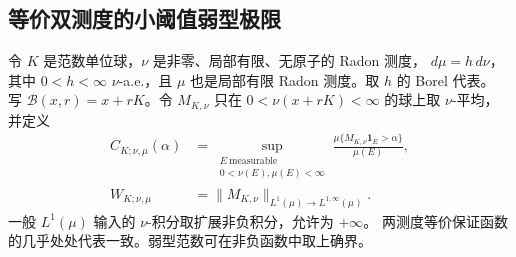 \subsection{等价双测度的小阈值弱型极限}\label{sec:two-measure-weak}

令 $K$ 是范数单位球，$\nu$ 是非零、局部有限、无原子的 Radon 测度，
$d\mu=h\,d\nu$，其中 $0<h<\infty$ $\nu$-a.e.，且 $\mu$ 也是局部有限 Radon 测度。取 $h$ 的 Borel 代表。
写 $\mathcal B(x,r)=x+rK$。令 $M_{K,\nu}$ 只在 $0<\nu(x+rK)<\infty$ 的球上取 $\nu$-平均，并定义
\[
 \begin{aligned}
 C_{K;\nu,\mu}(\alpha)&=
 \sup_{\substack{E\ \mathrm{measurable}\\0<\nu(E),\mu(E)<\infty}}
 \frac{\mu\{M_{K,\nu}\mathbf1_E>\alpha\}}{\mu(E)},\\
 W_{K;\nu,\mu}&=\|M_{K,\nu}\|_{L^1(\mu)\to L^{1,\infty}(\mu)}.
 \end{aligned}\tag{TM.1}
\]
一般 $L^1(\mu)$ 输入的 $\nu$-积分取扩展非负积分，允许为 $+\infty$。
两测度等价保证函数的几乎处处代表一致。弱型范数可在非负函数中取上确界。

